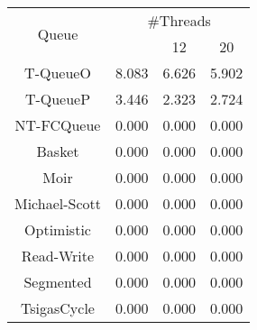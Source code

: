 \begin{tabular}{|c|c|c|c|}
\hline
\multirow{2}{*}{Queue} & \multicolumn{3}{c|}{\#Threads}\\\cline{2-4}& \quad 4 & 12 & 20\\
\hline
\hline
T-QueueO & 8.083 & 6.626 & 5.902\\
T-QueueP & 3.446 & 2.323 & 2.724\\
NT-FCQueue & 0.000 & 0.000 & 0.000\\
Basket & 0.000 & 0.000 & 0.000\\
Moir & 0.000 & 0.000 & 0.000\\
Michael-Scott & 0.000 & 0.000 & 0.000\\
Optimistic & 0.000 & 0.000 & 0.000\\
Read-Write & 0.000 & 0.000 & 0.000\\
Segmented & 0.000 & 0.000 & 0.000\\
TsigasCycle & 0.000 & 0.000 & 0.000\\
\hline\end{tabular}
